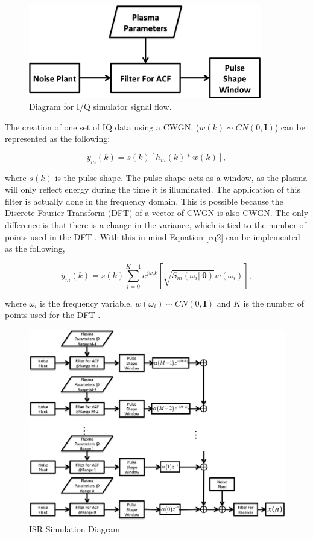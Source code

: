 \documentclass[draft,ras]{agutex}
\begin{document}
\begin{article}
\begin{figure}[h!]
\centering
\includegraphics[width=4in]{diagrampart}
\caption{Diagram for I/Q simulator signal flow.}
\label{fig:IQdiagram}
\end{figure}

The creation of one set of IQ data using a CWGN, ($w(k)\sim CN(0,\mathbf{I})$) can be represented as the following:   

\begin{equation}
\label{eq2}
y_m (k)= s(k)\left[h_m(k)*w(k)\right],
\end{equation}
 
\noindent where $s(k)$ is the pulse shape. The pulse shape acts as a window, as the plasma will only reflect energy during the time it is illuminated. The application of this filter is actually done in the frequency domain. This is possible because the Discrete Fourier Transform (DFT) of a vector of CWGN is also CWGN. The only difference is that there is a change in the variance, which is tied to the number of points used in the DFT \citep{kayvol1}. With this in mind Equation \ref{eq2} can be implemented as the following,

\begin{equation}
\label{eq:fftfilt}
y_m (k)= s(k)\displaystyle \sum_{i=0}^{K-1}e^{j\omega_ik}\left[ \sqrt{S_m(\omega_i | \: \bm{\theta})}w(\omega_i)\right],
\end{equation}

\noindent where $\omega_i$ is the frequency variable, $w(\omega_i) \sim CN(0,\mathbf{I})$ and $K$ is the number of points used for the DFT \citep{michellnoisesim1981}.

\begin{figure}[!h]
\centering
\includegraphics[width=7.0in]{diagram}
\caption{ISR Simulation Diagram}
\label{fig:isrdiag}
\end{figure}



\end{article}
\end{document}
